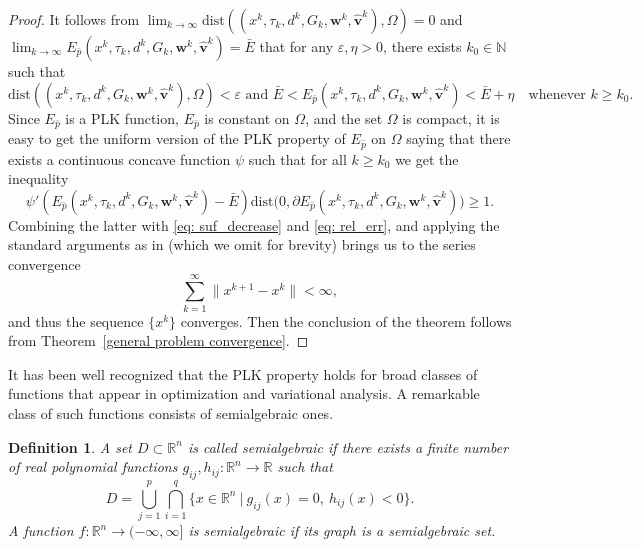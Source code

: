 \documentclass[11pt,a4paper]{article}
\def\hat{\widehat}\def\Hat{\widehat}
\newtheorem{definition}[theorem]{Definition}
\theoremstyle{plain}
\begin{document}
\begin{proof}
It follows from $\lim_{k \rightarrow \infty} \mathrm{dist}({(x^k, \tau_k, d^k, G_k, \mathbf{w}^k, \mathbf{\hat{v}}^k)}, \Omega) = 0$ and {$\lim_{k \rightarrow \infty} E_{\bar{p}}(x^k, \tau_k, d^k, G_k, \mathbf{w}^k, \allowbreak \mathbf{\hat{v}}^k) = \bar{E}$} that for any $\varepsilon, \eta > 0$, there exists $k_0\in\mathbb{N}$ such that 
\begin{equation*}
    \mathrm{dist}({(x^k, \tau_k, d^k, G_k, \mathbf{w}^k, \mathbf{\hat{v}}^k)}, \Omega) < \varepsilon  \text{ and }  \bar{E} < {E_{\bar{p}}(x^k, \tau_k, d^k, G_k, \mathbf{w}^k, \mathbf{\hat{v}}^k)} < \bar{E} + \eta \quad \mbox{whenever } k \ge k_0.
\end{equation*}
Since $E_{\bar{p}}$ is a PLK function, $E_{\bar{p}}$ is constant on $\Omega$, and the set $\Omega$ is compact, it is easy to get the uniform version of the PLK property of $E_{\bar{p}}$ on $\Omega$ saying that there exists a continuous concave function $\psi$ such that for all $k \ge k_0$ we get the inequality
\[
\psi' \left( {E_{ \bar{p}}(x^k, \tau_k, d^k, G_k, \mathbf{w}^k, \mathbf{\hat{v}}^k)} - \bar{E} \right) \mathrm{dist}\big( 0, {\partial} {E_{\bar{p}}(x^k, \tau_k, d^k, G_k, \mathbf{w}^k, \mathbf{\hat{v}}^k)} \big)\ge 1.
\]
Combining the latter with \eqref{eq: suf_decrease} and \eqref{eq: rel_err}, and applying the standard arguments as in \cite{Attouch2013} (which we omit for brevity) brings us to the series convergence
$$
\sum_{k=1}^\infty\| x^{k+1} - x^k \| < \infty,
$$
and thus the sequence $\{x^k\}$ converges. Then the conclusion of the theorem follows from Theorem~\ref{general problem convergence}.
\end{proof}\vspace*{0.05in}

It has been well recognized that the PLK property holds for broad classes of functions that appear in optimization and variational analysis.  A remarkable class of such functions consists of semialgebraic ones.

\begin{definition} A {\em set} $D \subset \mathbb{R}^n$ is called  {\em semialgebraic} if there exists a finite number
of real polynomial functions $g_{ij}, h_{ij}: \mathbb{R}^n \rightarrow \mathbb{R}$ such that
\[
D = \bigcup_{j = 1}^p\bigcap_{i = 1}^q\{x \in \mathbb{R}^n ~|~ g_{ij}(x) = 0, ~ h_{ij}(x) < 0 \}.
\]
A {\em function} $f : \mathbb{R}^n \rightarrow (-\infty, \infty]$ is {\em semialgebraic} if its graph
is a semialgebraic set.
\end{definition}
\end{document}
